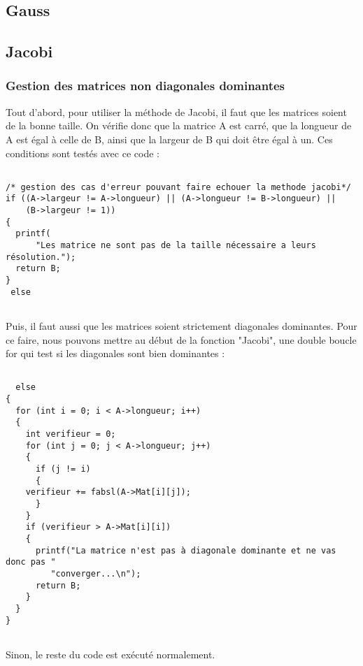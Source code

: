 \documentclass[letter]{article}
\begin{document}
\subsection{Gauss}
\label{sec:orge305c38}

\subsection{Jacobi}
\label{sec:orgfd1985c}

\subsubsection{Gestion des matrices non diagonales dominantes}
\label{sec:org2bfa832}


Tout d'abord, pour utiliser la méthode de Jacobi, il faut que les matrices soient de la bonne taille. On vérifie donc que la matrice A est carré, que la longueur de A est égal à celle de B, ainsi que la largeur de B qui doit être égal à un. Ces conditions sont testés avec ce code :
\begin{verbatim}

/* gestion des cas d'erreur pouvant faire echouer la methode jacobi*/
if ((A->largeur != A->longueur) || (A->longueur != B->longueur) ||
    (B->largeur != 1))
{
  printf(
      "Les matrice ne sont pas de la taille nécessaire a leurs résolution.");
  return B;
}
 else


\end{verbatim}



Puis, il faut aussi que les matrices soient strictement diagonales dominantes.
Pour ce faire, nous pouvons mettre au début de la fonction "Jacobi", une double boucle for qui test si les diagonales sont bien dominantes :

\begin{verbatim}

  else
{
  for (int i = 0; i < A->longueur; i++)
  {
    int verifieur = 0;
    for (int j = 0; j < A->longueur; j++)
    {
      if (j != i)
      {
	verifieur += fabsl(A->Mat[i][j]);
      }
    }
    if (verifieur > A->Mat[i][i])
    {
      printf("La matrice n'est pas à diagonale dominante et ne vas donc pas "
	     "converger...\n");
      return B;
    }
  }
}


\end{verbatim}


Sinon, le reste du code est exécuté normalement.
\end{document}
